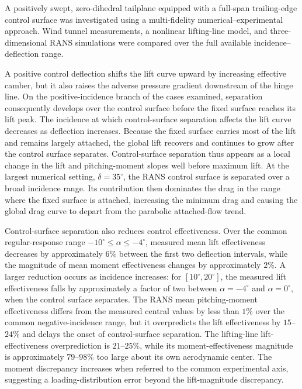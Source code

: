 \documentclass[journal ]{new-aiaa}
\begin{document}
A positively swept, zero-dihedral tailplane equipped with a full-span trailing-edge control surface was investigated using a multi-fidelity numerical--experimental approach.
Wind tunnel measurements, a nonlinear lifting-line model, and three-dimensional RANS simulations were compared over the full available incidence--deflection range.

A positive control deflection shifts the lift curve upward by increasing effective camber, but it also raises the adverse pressure gradient downstream of the hinge line. On the positive-incidence branch of the cases examined, separation consequently develops over the control surface before the fixed surface reaches its lift peak. The incidence at which control-surface separation affects the lift curve decreases as deflection increases.
Because the fixed surface carries most of the lift and remains largely attached, the global lift recovers and continues to grow after the control surface separates.
Control-surface separation thus appears as a local change in the lift and pitching-moment slopes well before maximum lift.
At the largest numerical setting, \(\delta=35^\circ\), the RANS control surface is separated over a broad incidence range.
Its contribution then dominates the drag in the range where the fixed surface is attached, increasing the minimum drag and causing the global drag curve to depart from the parabolic attached-flow trend.

Control-surface separation also reduces control effectiveness.
Over the common regular-response range \(-10^\circ\leq\alpha\leq-4^\circ\), measured mean lift effectiveness decreases by approximately \(6\%\) between the first two deflection intervals, while the magnitude of mean moment effectiveness changes by approximately \(2\%\).
A larger reduction occurs as incidence increases: for \([10^\circ,20^\circ]\), the measured lift effectiveness falls by approximately a factor of two between \(\alpha=-4^\circ\) and \(\alpha=0^\circ\), when the control surface separates.
The RANS mean pitching-moment effectiveness differs from the measured central values by less than \(1\%\) over the common negative-incidence range, but it overpredicts the lift effectiveness by \(15\)--\(24\%\) and delays the onset of control-surface separation.
The lifting-line lift-effectiveness overprediction is \(21\)--\(25\%\), while its moment-effectiveness magnitude is approximately \(79\)--\(98\%\) too large about its own aerodynamic center. The moment discrepancy increases when referred to the common experimental axis, suggesting a loading-distribution error beyond the lift-magnitude discrepancy.
\end{document}
